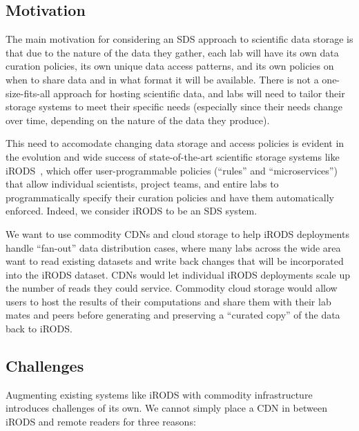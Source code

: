\subsection{Motivation}

The main motivation for considering an SDS approach to scientific data storage is
that due to the nature of the data they gather, each lab will have its own data curation
policies, its own unique data access patterns, and its own policies on when to
share data and in what format it will be available.  There is not a
one-size-fits-all approach for hosting scientific data, and labs will need to tailor
their storage systems to meet their specific needs (especially since their needs
change over time, depending on the nature of the data they produce).

This need to accomodate changing data storage and access policies is evident in
the evolution and wide success of state-of-the-art scientific storage systems
like iRODS~\cite{irods}, which offer
user-programmable policies (``rules'' and ``microservices'') that allow
individual scientists, project teams, and entire labs to programmatically
specify their curation policies and have them automatically enforced.
Indeed, we consider iRODS to be an SDS system.

We want to use commodity CDNs and cloud storage to help iRODS deployments
handle ``fan-out'' data distribution cases, where many labs across the wide
area want to read existing datasets and write back changes that will be
incorporated into the iRODS dataset.  CDNs would let individual iRODS
deployments scale up the number of reads they could service.  Commodity cloud
storage would allow users to host the results of their computations and share
them with their lab mates and peers before generating and preserving a
``curated copy'' of the data back to iRODS.

\subsection{Challenges}

Augmenting existing systems like iRODS
with commodity infrastructure introduces challenges of
its own.  We cannot simply place a CDN in between iRODS and remote readers for
three reasons:

